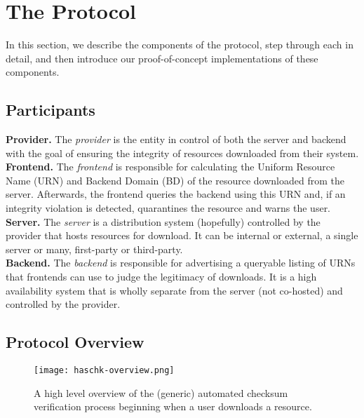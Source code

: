 \section{The \SYSTEM{} Protocol} \label{sec:approach}

In this section, we describe the components of the \SYSTEM{} protocol, step
through each in detail, and then introduce our proof-of-concept implementations
of these components.

\subsection{Participants}

\noindent\textbf{Provider.} The \emph{provider} is the entity in control of both
the server and backend with the goal of ensuring the integrity of resources
downloaded from their system. \\

\noindent\textbf{\SYSTEM{} Frontend.} The \emph{frontend} is responsible for
calculating the Uniform Resource Name (URN) and Backend Domain (BD) of the
resource downloaded from the server. Afterwards, the frontend queries the
backend using this URN and, if an integrity violation is detected, quarantines
the resource and warns the user. \\

\noindent\textbf{Server.} The \emph{server} is a distribution system (hopefully)
controlled by the provider that hosts resources for download. It can be internal
or external, a single server or many, first-party or third-party. \\

\noindent\textbf{\SYSTEM{} Backend.} The \emph{backend} is responsible for
advertising a queryable listing of URNs that \SYSTEM{} frontends can use to
judge the legitimacy of downloads. It is a high availability system that is
wholly separate from the server (not co-hosted) and controlled by the provider.

\subsection{Protocol Overview}

\begin{figure}[ht]
    \centering
    \texttt{[image: haschk-overview.png]}
    \caption{A high level overview of the (generic) automated checksum
    verification process beginning when a user downloads a
    resource.}\label{fig:protocol}
\end{figure}

